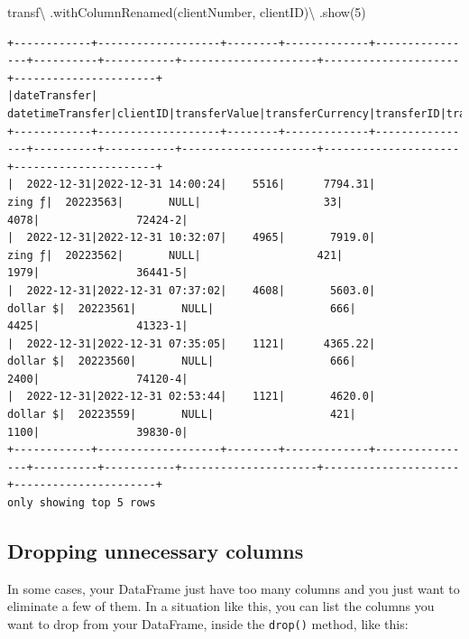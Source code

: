 \documentclass[
  11pt,
  letterpaper,
  DIV=11,
  numbers=noendperiod]{scrreprt}
\newenvironment{Shaded}{\begin{snugshade}}{\end{snugshade}}
\newcommand{\DecValTok}[1]{\textcolor[rgb]{0.68,0.00,0.00}{#1}}
\newcommand{\NormalTok}[1]{\textcolor[rgb]{0.00,0.23,0.31}{#1}}
\newcommand{\OperatorTok}[1]{\textcolor[rgb]{0.37,0.37,0.37}{#1}}
\newcommand{\StringTok}[1]{\textcolor[rgb]{0.13,0.47,0.30}{#1}}
\begin{document}
\begin{Shaded}
\begin{Highlighting}[]
\NormalTok{transf}\OperatorTok{\textbackslash{}}
\NormalTok{  .withColumnRenamed(}\StringTok{\textquotesingle{}clientNumber\textquotesingle{}}\NormalTok{, }\StringTok{\textquotesingle{}clientID\textquotesingle{}}\NormalTok{)}\OperatorTok{\textbackslash{}}
\NormalTok{  .show(}\DecValTok{5}\NormalTok{)}
\end{Highlighting}
\end{Shaded}

\begin{verbatim}
+------------+-------------------+--------+-------------+----------------+----------+-----------+---------------------+---------------------+----------------------+
|dateTransfer|   datetimeTransfer|clientID|transferValue|transferCurrency|transferID|transferLog|destinationBankNumber|destinationBankBranch|destinationBankAccount|
+------------+-------------------+--------+-------------+----------------+----------+-----------+---------------------+---------------------+----------------------+
|  2022-12-31|2022-12-31 14:00:24|    5516|      7794.31|          zing ƒ|  20223563|       NULL|                   33|                 4078|               72424-2|
|  2022-12-31|2022-12-31 10:32:07|    4965|       7919.0|          zing ƒ|  20223562|       NULL|                  421|                 1979|               36441-5|
|  2022-12-31|2022-12-31 07:37:02|    4608|       5603.0|        dollar $|  20223561|       NULL|                  666|                 4425|               41323-1|
|  2022-12-31|2022-12-31 07:35:05|    1121|      4365.22|        dollar $|  20223560|       NULL|                  666|                 2400|               74120-4|
|  2022-12-31|2022-12-31 02:53:44|    1121|       4620.0|        dollar $|  20223559|       NULL|                  421|                 1100|               39830-0|
+------------+-------------------+--------+-------------+----------------+----------+-----------+---------------------+---------------------+----------------------+
only showing top 5 rows
\end{verbatim}

\hypertarget{dropping-unnecessary-columns}{%
\subsection{Dropping unnecessary
columns}\label{dropping-unnecessary-columns}}

In some cases, your DataFrame just have too many columns and you just
want to eliminate a few of them. In a situation like this, you can list
the columns you want to drop from your DataFrame, inside the
\texttt{drop()} method, like this:
\end{document}
